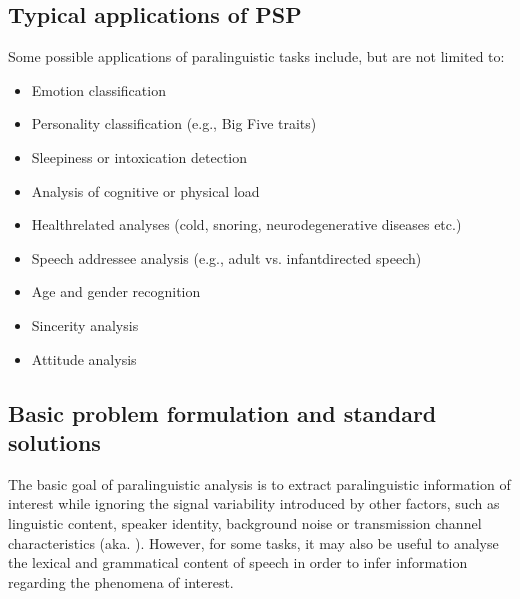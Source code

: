 \documentclass[letterpaper,10pt,english]{jupyterBook}
\begin{document}
\subsection{Typical applications of PSP}
\label{\detokenize{Recognition/Paralinguistic_speech_processing:typical-applications-of-psp}}
\sphinxAtStartPar
Some possible applications of paralinguistic tasks include, but are not
limited to:
\begin{itemize}
\item {} 
\sphinxAtStartPar
Emotion classification

\item {} 
\sphinxAtStartPar
Personality classification (e.g., Big Five traits)

\item {} 
\sphinxAtStartPar
Sleepiness or intoxication detection

\item {} 
\sphinxAtStartPar
Analysis of cognitive or physical load

\item {} 
\sphinxAtStartPar
Health\sphinxhyphen{}related analyses (cold, snoring, neurodegenerative diseases
etc.)

\item {} 
\sphinxAtStartPar
Speech addressee analysis (e.g., adult\sphinxhyphen{} vs. infant\sphinxhyphen{}directed speech)

\item {} 
\sphinxAtStartPar
Age and gender recognition

\item {} 
\sphinxAtStartPar
Sincerity analysis

\item {} 
\sphinxAtStartPar
Attitude analysis

\end{itemize}


\subsection{Basic problem formulation and standard solutions}
\label{\detokenize{Recognition/Paralinguistic_speech_processing:basic-problem-formulation-and-standard-solutions}}
\sphinxAtStartPar
The basic goal of paralinguistic analysis is to extract paralinguistic
information of interest while ignoring the signal variability introduced
by other factors, such as linguistic content, speaker identity,
background noise or transmission channel characteristics (aka. ). However, for some tasks, it may also be useful to analyse the
lexical and grammatical content of speech in order to infer information
regarding the phenomena of interest.
\end{document}
